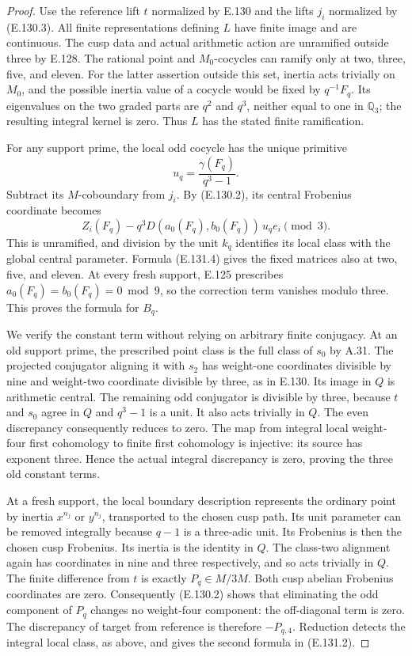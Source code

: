 \begin{proof}
Use the reference lift \(t\) normalized by E.130 and
the lifts \(j_i\) normalized by (E.130.3).
All finite representations defining \(L\) have finite
image and are continuous. The cusp data and actual
arithmetic action are unramified outside three by
E.128. The rational point and \(M_0\)-cocycles can
ramify only at two, three, five, and eleven.
For the latter assertion outside this set, inertia
acts trivially on \(M_0\), and the possible inertia
value of a cocycle would be fixed by \(q^{-1}F_q\).
Its eigenvalues on the two graded parts are
\(q^2\) and \(q^3\), neither equal to one in
\(\mathbb Q_3\); the resulting integral kernel is zero.
Thus \(L\) has the stated finite ramification.

For any support prime, the local odd cocycle has the
unique primitive
\[
                         u_q=\frac{\gamma(F_q)}{q^3-1}.
\]
Subtract its \(M\)-coboundary from \(j_i\). By
(E.130.2), its central Frobenius coordinate becomes
\[
 Z_i(F_q)-
       q^3D(a_0(F_q),b_0(F_q))\,u_q e_i
                           \pmod3 .
 \tag{E.131.4}
\]
This is unramified, and division by the unit \(k_q\)
identifies its local class with the global central
parameter. Formula (E.131.4) gives the fixed matrices
also at two, five, and eleven.
At every fresh support, E.125 prescribes
\(a_0(F_q)=b_0(F_q)=0\bmod9\), so the correction term
vanishes modulo three. This proves the formula for
\(B_q\).

We verify the constant term without relying on arbitrary
finite conjugacy. At an old support prime, the prescribed
point class is the full class of \(s_0\) by A.31.
The projected conjugator aligning it with \(s_2\)
has weight-one coordinates divisible by nine and
weight-two coordinate divisible by three, as in
E.130. Its image in \(Q\) is arithmetic central.
The remaining odd conjugator is divisible by three,
because \(t\) and \(s_0\) agree in \(Q\) and
\(q^3-1\) is a unit. It also acts trivially in \(Q\).
The even discrepancy consequently reduces to zero.
The map from integral local weight-four first
cohomology to finite first cohomology is injective:
its source has exponent three. Hence the actual
integral discrepancy is zero, proving the three
old constant terms.

At a fresh support, the local boundary description
represents the ordinary point by inertia \(x^{n_j}\)
or \(y^{n_j}\), transported to the chosen cusp path.
Its unit parameter can be removed integrally because
\(q-1\) is a three-adic unit. Its Frobenius is then
the chosen cusp Frobenius. Its inertia is the identity
in \(Q\). The class-two alignment again has coordinates
in nine and three respectively, and so acts trivially
in \(Q\).
The finite difference from \(t\) is exactly
\(P_q\in M/3M\).
Both cusp abelian Frobenius coordinates are zero.
Consequently (E.130.2) shows that eliminating the
odd component of \(P_q\) changes no weight-four
component: the off-diagonal term is zero.
The discrepancy of target from reference is therefore
\(-P_{q,4}\). Reduction detects the integral local
class, as above, and gives the second formula in
(E.131.2).


\end{proof}
